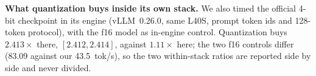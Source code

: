 \textbf{What quantization buys inside its own stack.} We also timed the
official 4-bit checkpoint in its engine (vLLM~0.26.0, same L40S, prompt
token ids and 128-token protocol), with the f16 model as in-engine control.
Quantization buys $2.413\times$ there, $[2.412, 2.414]$, against
$1.11\times$ here; the two f16 controls differ (83.09 against our
43.5~tok/s), so the two within-stack ratios are reported side by side and
never divided.

